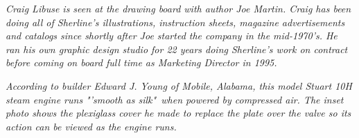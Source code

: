 \bigskip\textit{Craig Libuse is seen at the drawing board with author Joe
Martin. Craig has been doing all of Sherline's illustrations, instruction
sheets, magazine advertisements and catalogs since shortly after Joe started the
company in the mid-1970's. He ran his own graphic design studio for 22 years
doing Sherline's work on contract before coming on board full time as Marketing
Director in 1995.}\bigskip

\bigskip\textit{According to builder Edward J. Young of Mobile, Alabama, this
model Stuart 10H steam engine runs "'smooth as silk"\ when powered by compressed
air. The inset photo shows the plexiglass cover he made to replace the plate
over the valve so its action can be viewed as the engine runs.}\bigskip

\secup
\secup
